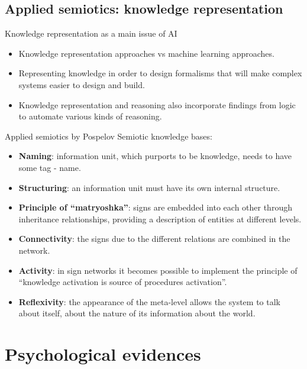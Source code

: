 \documentclass[default]{beamer}
\begin{document}
	\subsection{Applied semiotics: knowledge representation}
	\begin{frame}{Knowledge representation as a main issue of AI}
		\begin{itemize}
			\item Knowledge representation approaches vs machine learning approaches.
			\item Representing knowledge in order to design formalisms that will make complex systems easier to design and build. 
			\item Knowledge representation and reasoning also incorporate findings from logic to automate various kinds of reasoning.
		\end{itemize}
		
		\par\bigskip
		\nocite{*}
		\printbibliography[keyword={finn}, resetnumbers=true]
	\end{frame}
	\begin{frame}{Applied semiotics by Pospelov}
		\small
		Semiotic knowledge bases:
		\begin{itemize}
			\item \textbf{Naming}: information unit, which purports to be knowledge, needs to have some tag - name.
			\item \textbf{Structuring}: an information unit must have its own internal structure.
			\item \textbf{Principle of ``matryoshka''}: signs are embedded into each other through inheritance relationships, providing a description of entities at different levels.
			\item \textbf{Connectivity}: the signs due to the different relations are combined in the network.
			\item \textbf{Activity}: in sign networks it becomes possible to implement the principle of ``knowledge activation is source of procedures activation''.
			\item \textbf{Reflexivity}: the appearance of the meta-level allows the system to talk about itself, about the nature of its information about the world.
		\end{itemize}

		\nocite{*}
		\printbibliography[keyword={semiotics}, resetnumbers=true]
	\end{frame}

	\section{Psychological evidences}
\end{document}
